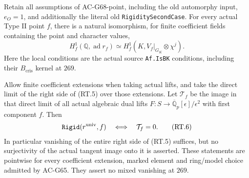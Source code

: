 \begin{theorem}
\label{AC-G68}
Retain all assumptions of AC-G68-point, including
the old automorphy input, \(e_O=1\), and additionally
the literal old \texttt{RigiditySecondCase}.
For every actual Type II point \(f\), there is a
natural isomorphism, for finite coefficient fields
containing the point and character values,
\[
 H_f^1(\mathbb Q,\operatorname{ad}r_f)
       \simeq H_f^1(K,V_f|_{G_K}\otimes\chi^j).
                                                        \tag{RT.5}
\]
Here the local conditions are the actual source
\texttt{Af.IsBK} conditions, including their
\(B_{\mathrm{cris}}\) kernel at \(269\).

Allow finite coefficient extensions when taking actual
lifts, and take the direct limit of the right side of
(RT.5) over those extensions. Let \(\mathcal T_f\)
be the image in that direct limit of all actual algebraic dual lifts
\(F:S\to\overline{\mathbb Q}_p[\epsilon]/\epsilon^2\)
with first component \(f\). Then
\[
 \texttt{Rigid}(r^{\rm univ},f)
                  \quad\Longleftrightarrow\quad
                         \mathcal T_f=0.              \tag{RT.6}
\]
In particular vanishing of the entire right side of
(RT.5) suffices, but no surjectivity of the actual
tangent image onto it is asserted. These statements
are pointwise for every coefficient extension,
marked element and ring/model choice admitted by
AC-G65. They assert no mixed vanishing at \(269\).
\end{theorem}
